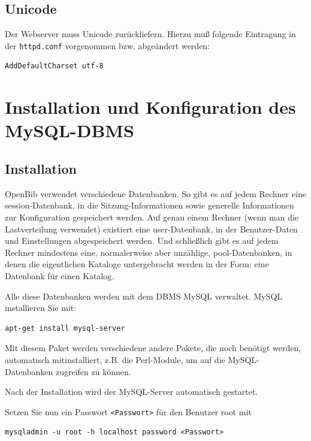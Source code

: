 \documentclass[11pt, twoside, a4paper, BCOR8mm, DIV12, bibtotoc,idxtotoc]{scrbook}
\begin{document}
\subsection{Unicode}

Der Webserver muss Unicode zurückliefern. Hierzu muß folgende
Eintragung in der \texttt{httpd.conf} vorgenommen bzw. abgeändert
werden:

\begin{verbatim}
AddDefaultCharset utf-8
\end{verbatim}

\section{Installation und Konfiguration des MySQL-DBMS}
\label{sec:instmysql}


\subsection{Installation}

OpenBib verwendet verschiedene Datenbanken. So gibt es auf jedem
Rechner eine session-Datenbank, in die Sitzung-Informationen sowie
generelle Informationen zur Konfiguration gespeichert werden. Auf
genau einem Rechner (wenn man die Lastverteilung verwendet) existiert
eine user-Datenbank, in der Benutzer-Daten und Einstellungen
abgespeichert werden. Und schließlich gibt es auf jedem Rechner
mindestens eine, normalerweise aber unzählige, pool-Datenbanken, in
denen die eigentlichen Kataloge untergebracht werden in der Form: eine
Datenbank für einen Katalog.

Alle diese Datenbanken werden mit dem DBMS MySQL verwaltet. MySQL
installieren Sie mit:

\begin{verbatim}
apt-get install mysql-server
\end{verbatim}

Mit diesem Paket werden verschiedene andere Pakete, die noch benötigt
werden, automatisch mitinstalliert, z.B. die Perl-Module, um auf die
MySQL-Datenbanken zugreifen zu können.

Nach der Installation wird der MySQL-Server automatisch gestartet.

Setzen Sie nun ein Passwort \texttt{<Passwort>} für den Benutzer root mit

\begin{verbatim}
mysqladmin -u root -h localhost password <Passwort>
\end{verbatim}
\end{document}

